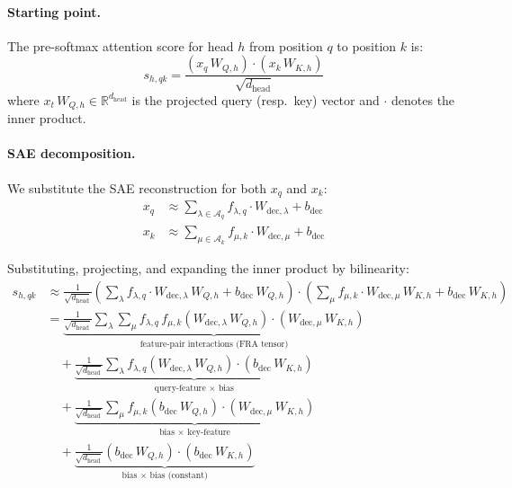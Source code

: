 \documentclass{article}
\theoremstyle{plain}
\theoremstyle{definition}
\theoremstyle{remark}
\newcommand{\dhead}{d_{\mathrm{head}}}
\newcommand{\RR}{\mathbb{R}}
\begin{document}
\paragraph{Starting point.} The pre-softmax attention score for head $h$ from position $q$ to position $k$ is:
\begin{equation}
    s_{h,qk} = \frac{\left(x_q\,W_{Q,h}\right) \cdot \left(x_k\,W_{K,h}\right)}{\sqrt{\dhead}}
\end{equation}
where $x_t\,W_{Q,h} \in \RR^{\dhead}$ is the projected query (resp.\ key) vector and $\cdot$ denotes the inner product.

\paragraph{SAE decomposition.} We substitute the SAE reconstruction for both $x_q$ and $x_k$:
\begin{align}
    x_q &\approx \sum_{\lambda \in \mathcal{A}_q} f_{\lambda,q} \cdot W_{\mathrm{dec},\lambda} + b_{\mathrm{dec}} \\
    x_k &\approx \sum_{\mu \in \mathcal{A}_k} f_{\mu,k} \cdot W_{\mathrm{dec},\mu} + b_{\mathrm{dec}}
\end{align}

Substituting, projecting, and expanding the inner product by bilinearity:
\begin{align}
    s_{h,qk} &\approx \frac{1}{\sqrt{\dhead}} \left( \sum_\lambda f_{\lambda,q} \cdot W_{\mathrm{dec},\lambda}\,W_{Q,h} + b_{\mathrm{dec}}\,W_{Q,h} \right) \cdot \left( \sum_\mu f_{\mu,k} \cdot W_{\mathrm{dec},\mu}\,W_{K,h} + b_{\mathrm{dec}}\,W_{K,h} \right) \\
    &= \underbrace{\frac{1}{\sqrt{\dhead}} \sum_\lambda \sum_\mu f_{\lambda,q} \, f_{\mu,k} \left( W_{\mathrm{dec},\lambda}\,W_{Q,h} \right) \cdot \left( W_{\mathrm{dec},\mu}\,W_{K,h} \right)}_{\text{feature-pair interactions (FRA tensor)}} \label{eq:app_fra_main} \\
    &\quad + \underbrace{\frac{1}{\sqrt{\dhead}} \sum_\lambda f_{\lambda,q} \left( W_{\mathrm{dec},\lambda}\,W_{Q,h} \right) \cdot \left( b_{\mathrm{dec}}\,W_{K,h} \right)}_{\text{query-feature $\times$ bias}} \label{eq:app_qbias} \\
    &\quad + \underbrace{\frac{1}{\sqrt{\dhead}} \sum_\mu f_{\mu,k} \left( b_{\mathrm{dec}}\,W_{Q,h} \right) \cdot \left( W_{\mathrm{dec},\mu}\,W_{K,h} \right)}_{\text{bias $\times$ key-feature}} \label{eq:app_kbias} \\
    &\quad + \underbrace{\frac{1}{\sqrt{\dhead}} \left( b_{\mathrm{dec}}\,W_{Q,h} \right) \cdot \left( b_{\mathrm{dec}}\,W_{K,h} \right)}_{\text{bias $\times$ bias (constant)}} \label{eq:app_constbias}
\end{align}
\end{document}
